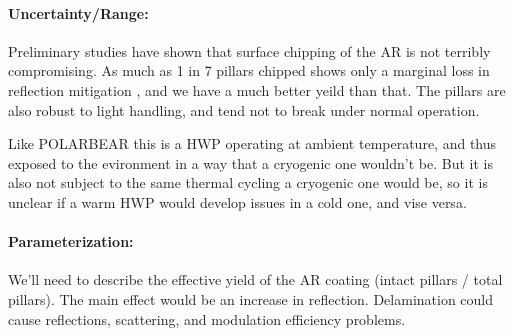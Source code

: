 \paragraph{Uncertainty/Range:}

Preliminary studies have shown that surface chipping of the AR is not terribly compromising. As much as 1 in 7 pillars chipped shows only a marginal loss in reflection mitigation \cite{SiAR_1}, and we have a much better yeild than that. The pillars are also robust to light handling, and tend not to break under normal operation.

Like POLARBEAR this is a HWP operating at ambient temperature, and thus exposed to the evironment in a way that a cryogenic one wouldn't be. But it is also not subject to the same thermal cycling a cryogenic one would be, so it is unclear if a warm HWP would develop issues in a cold one, and vise versa.

\paragraph{Parameterization:}
We'll need to describe the effective yield of the AR coating (intact pillars / total pillars). The main effect would be an increase in reflection. Delamination could cause reflections, scattering, and modulation efficiency problems.  
